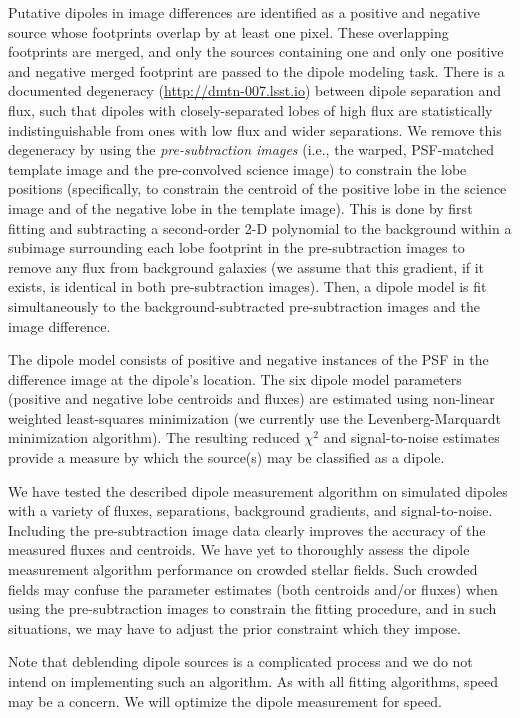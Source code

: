 Putative dipoles in image differences are identified as a positive and negative source whose footprints overlap by at least one pixel. These overlapping footprints are merged, and only the sources containing one and only one positive and negative merged footprint are passed to the dipole modeling task. There is a documented degeneracy (\url{http://dmtn-007.lsst.io}) between dipole separation and flux, such that dipoles with closely-separated lobes of high flux are statistically indistinguishable from ones with low flux and wider separations. We remove this degeneracy by using the {\em pre-subtraction images} (i.e., the warped, PSF-matched template image and the pre-convolved science image) to constrain the lobe positions (specifically, to constrain the centroid of the positive lobe in the science image and of the negative lobe in the template image). This is done by first fitting and subtracting a second-order 2-D polynomial to the background within a subimage surrounding each lobe footprint in the pre-subtraction images to remove any flux from background galaxies (we assume that this gradient, if it exists, is identical in both pre-subtraction images). Then, a dipole model is fit simultaneously to the background-subtracted pre-subtraction images and the image difference. 

The dipole model consists of positive and negative instances of the PSF in the difference image at the dipole's location. The six dipole model parameters (positive and negative lobe centroids and fluxes) are estimated using non-linear weighted least-squares minimization (we currently use the Levenberg-Marquardt minimization algorithm). The resulting reduced $\chi^2$ and signal-to-noise estimates provide a measure by which the source(s) may be classified as a dipole. 

We have tested the described dipole measurement algorithm on simulated dipoles with a variety of fluxes, separations, background gradients, and signal-to-noise. Including the pre-subtraction image data clearly improves the accuracy of the measured fluxes and centroids. We have yet to thoroughly assess the dipole measurement algorithm performance on crowded stellar fields. Such crowded fields may confuse the parameter estimates (both centroids and/or fluxes) when using the pre-subtraction images to constrain the fitting procedure, and in such situations, we may have to adjust the prior constraint which they impose.

Note that deblending dipole sources is a complicated process and we do not intend on implementing such an algorithm.  As with all fitting algorithms, speed may be a concern.  We will optimize the dipole measurement for speed.

